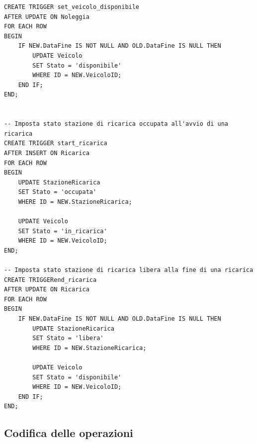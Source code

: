 \documentclass{article}
\begin{document}
\begin{lstlisting}
CREATE TRIGGER set_veicolo_disponibile
AFTER UPDATE ON Noleggia
FOR EACH ROW
BEGIN
    IF NEW.DataFine IS NOT NULL AND OLD.DataFine IS NULL THEN
        UPDATE Veicolo
        SET Stato = 'disponibile'
        WHERE ID = NEW.VeicoloID;
    END IF;
END;


-- Imposta stato stazione di ricarica occupata all'avvio di una ricarica
CREATE TRIGGER start_ricarica
AFTER INSERT ON Ricarica
FOR EACH ROW
BEGIN
    UPDATE StazioneRicarica
    SET Stato = 'occupata'
    WHERE ID = NEW.StazioneRicarica;

    UPDATE Veicolo
    SET Stato = 'in_ricarica'
    WHERE ID = NEW.VeicoloID;
END;

-- Imposta stato stazione di ricarica libera alla fine di una ricarica
CREATE TRIGGERend_ricarica
AFTER UPDATE ON Ricarica
FOR EACH ROW
BEGIN
    IF NEW.DataFine IS NOT NULL AND OLD.DataFine IS NULL THEN
        UPDATE StazioneRicarica
        SET Stato = 'libera'
        WHERE ID = NEW.StazioneRicarica;

        UPDATE Veicolo
        SET Stato = 'disponibile'
        WHERE ID = NEW.VeicoloID;
    END IF;
END;
\end{lstlisting}

\subsection{Codifica delle operazioni}
\end{document}
